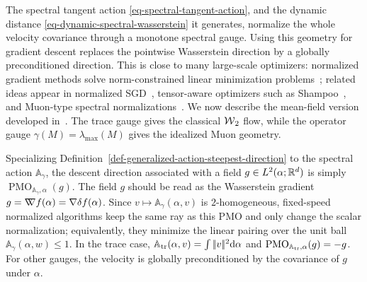 The spectral tangent action \eqref{eq-spectral-tangent-action}, and the dynamic distance \eqref{eq-dynamic-spectral-wasserstein} it generates, normalize the whole velocity covariance through a monotone spectral gauge. Using this geometry for gradient descent replaces the pointwise Wasserstein direction by a globally preconditioned direction. This is close to many large-scale optimizers: normalized gradient methods solve norm-constrained linear minimization problems~\cite{PethickXieAntonakopoulosEtAl2025}; related ideas appear in normalized SGD~\cite{MurraySwensonKar2019,CutkoskyMehta2020}, tensor-aware optimizers such as Shampoo~\cite{GuptaKorenSinger2018}, and Muon-type spectral normalizations~\cite{KellerJordan2024,LiuSuYaoEtAl2025}. We now describe the mean-field version developed in~\cite{peyre2026muon}. The trace gauge gives the classical $\operatorname{\mathcal{W}}_2$ flow, while the operator gauge $\gamma(M)=\lambda_{\max}(M)$ gives the idealized Muon geometry.

Specializing Definition~\ref{def-generalized-action-steepest-direction} to the spectral action \(\mathbb A_\gamma\), the descent direction associated with a field \(g\in L^2(\alpha;\mathbb{R}^d)\) is simply \(\operatorname{PMO}_{\mathbb A_\gamma,\alpha}(g)\).
The field \(g\) should be read as the Wasserstein gradient \(g=\mathord{\nabla\mkern-9.3mu\nabla} f(\alpha)=\nabla\delta f(\alpha)\). Since \(v\mapsto\mathbb A_\gamma(\alpha,v)\) is \(2\)-homogeneous, fixed-speed normalized algorithms keep the same ray as this PMO and only change the scalar normalization; equivalently, they minimize the linear pairing over the unit ball \(\mathbb A_\gamma(\alpha,w)\leq1\). In the trace case, \(\mathbb A_{\operatorname{tr}}(\alpha,v)=\int|\!| v |\!|^2\mathrm{d}\alpha\) and \(\operatorname{PMO}_{\mathbb A_{\operatorname{tr}},\alpha}(g)=-g\). For other gauges, the velocity is globally preconditioned by the covariance of \(g\) under \(\alpha\).

